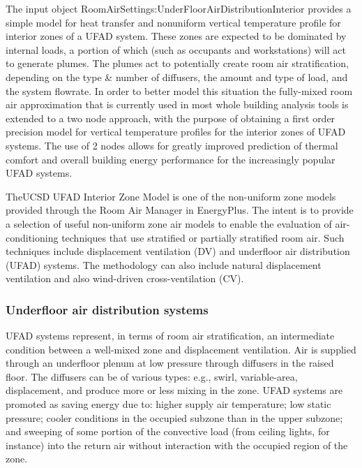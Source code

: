 The input object RoomAirSettings:UnderFloorAirDistributionInterior provides a simple model for heat transfer and nonuniform vertical temperature profile for interior zones of a UFAD system. These zones are expected to be dominated by internal loads, a portion of which (such as occupants and workstations) will act to generate plumes. The plumes act to potentially create room air stratification, depending on the type \& number of diffusers, the amount and type of load, and the system flowrate. In order to better model this situation the fully-mixed room air approximation that is currently used in most whole building analysis tools is extended to a two node approach, with the purpose of obtaining a first order precision model for vertical temperature profiles for the interior zones of UFAD systems. The use of 2 nodes allows for greatly improved prediction of thermal comfort and overall building energy performance for the increasingly popular UFAD systems.

TheUCSD UFAD Interior Zone Model is one of the non-uniform zone models provided through the Room Air Manager in EnergyPlus. The intent is to provide a selection of useful non-uniform zone air models to enable the evaluation of air-conditioning techniques that use stratified or partially stratified room air. Such techniques include displacement ventilation (DV) and underfloor air distribution (UFAD) systems. The methodology can also include natural displacement ventilation and also wind-driven cross-ventilation (CV).

\subsubsection{Underfloor air distribution systems}\label{underfloor-air-distribution-systems}

UFAD systems represent, in terms of room air stratification, an intermediate condition between a well-mixed zone and displacement ventilation. Air is supplied through an underfloor plenum at low pressure through diffusers in the raised floor. The diffusers can be of various types: e.g., swirl, variable-area, displacement, and produce more or less mixing in the zone. UFAD systems are promoted as saving energy due to: higher supply air temperature; low static pressure; cooler conditions in the occupied subzone than in the upper subzone; and sweeping of some portion of the convective load (from ceiling lights, for instance) into the return air without interaction with the occupied region of the zone.

